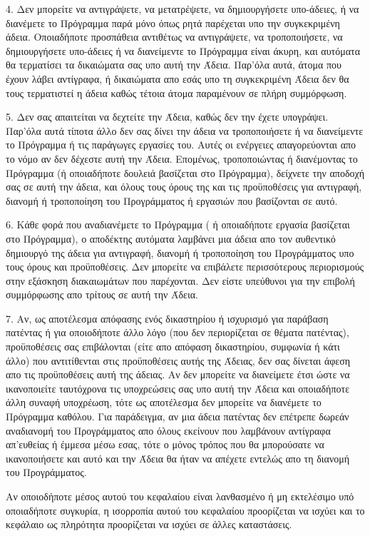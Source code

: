 \begin{small}
4. Δεν μπορείτε να αντιγράψετε, να μετατρέψετε, να δημιουργήσετε υπο-άδειες, ή να διανέμετε το Πρόγραμμα παρά μόνο όπως ρητά παρέχεται υπο την συγκεκριμένη άδεια. Οποιαδήποτε προσπάθεια αντιθέτως να αντιγράψετε, να τροποποιήσετε, να δημιουργήσετε υπο-άδειες ή να διανείμεντε το Πρόγραμμα είναι άκυρη, και αυτόματα θα τερματίσει τα δικαιώματα σας υπο αυτή την Άδεια. Παρ'όλα αυτά, άτομα που έχουν λάβει αντίγραφα, ή δικαιώματα απο εσάς υπο τη συγκεκριμένη Άδεια δεν θα τους τερματιστεί η άδεια καθώς τέτοια άτομα παραμένουν σε πλήρη συμμόρφωση.

5. Δεν σας απαιτείται να δεχτείτε την Άδεια, καθώς δεν την έχετε υπογράψει. Παρ'όλα αυτά τίποτα άλλο δεν σας δίνει την άδεια να τροποποιήσετε ή να διανείμεντε το Πρόγραμμα ή τις παράγωγες εργασίες του.  Αυτές οι ενέργειες απαγορεύονται απο το νόμο αν δεν δέχεστε αυτή την Άδεια. Επομένως, τροποποιώντας ή διανέμοντας το Πρόγραμμα (ή οποιαδήποτε δουλειά βασίζεται στο Πρόγραμμα), δείχνετε την αποδοχή σας σε αυτή την άδεια, και όλους τους όρους της και τις προϋποθέσεις για αντιγραφή, διανομή ή τροποποίηση του Προγράμματος ή εργασιών που βασίζονται σε αυτό.

6. Κάθε φορά που αναδιανέμετε το Πρόγραμμα ( ή οποιαδήποτε εργασία βασίζεται στο Πρόγραμμα), ο αποδέκτης αυτόματα λαμβάνει μια άδεια απο τον αυθεντικό δημιουργό της άδεια για αντιγραφή, διανομή ή τροποποίηση του Προγράμματος υπο τους όρους και προϋποθέσεις. Δεν μπορείτε να επιβάλετε περισσότερους περιορισμούς στην εξάσκηση διακαιωμάτων που παρέχονται. Δεν είστε υπεύθυνοι για την επιβολή συμμόρφωσης απο τρίτους σε αυτή την Άδεια.

7. Αν, ως αποτέλεσμα απόφασης ενός δικαστηρίου ή ισχυρισμό για παράβαση πατέντας ή για οποιοδήποτε άλλο λόγο (που δεν περιορίζεται σε θέματα πατέντας), προϋποθέσεις σας επιβάλονται (είτε απο απόφαση δικαστηρίου, συμφωνία ή κάτι άλλο) που αντιτίθενται στις προϋποθέσεις αυτής της Άδειας, δεν σας δίνεται άφεση απο τις προϋποθέσεις αυτή της άδειας. Αν δεν μπορείτε να διανείμετε έτσι ώστε να ικανοποιείτε ταυτόχρονα τις υποχρεώσεις σας υπο αυτή την Άδεια και οποιαδήποτε άλλη συναφή υποχρέωση, τότε ως αποτέλεσμα δεν μπορείτε να διανέμετε το Πρόγραμμα καθόλου. Για παράδειγμα, αν μια άδεια πατέντας δεν επέτρεπε δωρεάν αναδιανομή του Προγράμματος απο όλους εκείνουν που λαμβάνουν αντίγραφα απ'ευθείας ή έμμεσα μέσω εσας, τότε ο μόνος τρόπος που θα μπορούσατε να ικανοποιήσετε και αυτό και την Άδεια θα ήταν να απέχετε εντελώς απο τη διανομή του Προγράμματος.

 Αν οποιοδήποτε μέσος αυτού του κεφαλαίου είναι λανθασμένο ή μη εκτελέσιμο υπό οποιαδήποτε συγκυρία, η ισορροπία αυτού του κεφαλαίου προορίζεται να ισχύει και το κεφάλαιο ως πληρότητα προορίζεται να ισχύει σε άλλες καταστάσεις.


\end{small}
